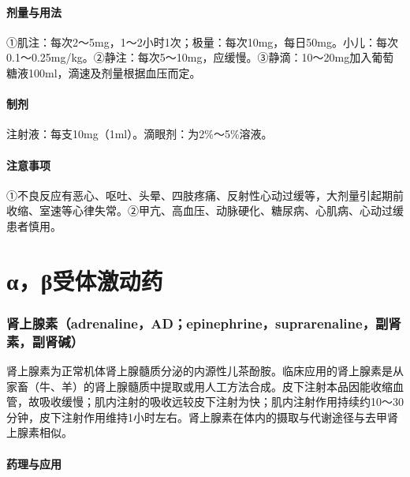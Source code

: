 \paragraph{剂量与用法}

①肌注：每次2～5mg，1～2小时1次；极量：每次10mg，每日50mg。小儿：每次0.1～0.25mg/kg。②静注：每次5～10mg，应缓慢。③静滴：10～20mg加入葡萄糖液100ml，滴速及剂量根据血压而定。

\paragraph{制剂}

注射液：每支10mg（1ml）。滴眼剂：为2\%～5\%溶液。

\paragraph{注意事项}

①不良反应有恶心、呕吐、头晕、四肢疼痛、反射性心动过缓等，大剂量引起期前收缩、室速等心律失常。②甲亢、高血压、动脉硬化、糖尿病、心肌病、心动过缓患者慎用。

\protect\hypertarget{text00406.html}{}{}

\section{α，β受体激动药}

\subsubsection{肾上腺素（adrenaline，AD；epinephrine，suprarenaline，副肾素，副肾碱）}

肾上腺素为正常机体肾上腺髓质分泌的内源性儿茶酚胺。临床应用的肾上腺素是从家畜（牛、羊）的肾上腺髓质中提取或用人工方法合成。皮下注射本品因能收缩血管，故吸收缓慢；肌内注射的吸收远较皮下注射为快；肌内注射作用持续约10～30分钟，皮下注射作用维持1小时左右。肾上腺素在体内的摄取与代谢途径与去甲肾上腺素相似。

\paragraph{药理与应用}

